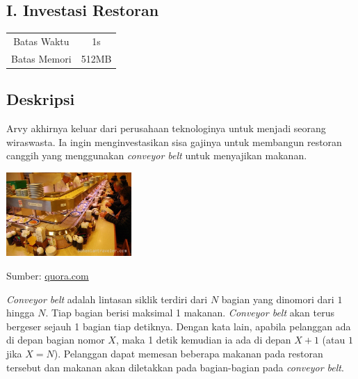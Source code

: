 \documentclass{article}
\begin{document}
\begin{center}
    \section*{I. Investasi Restoran}

    \begin{tabular}{ | c c | }
        \hline
        Batas Waktu  & 1s \\
        Batas Memori & 512MB \\
        \hline
    \end{tabular}
\end{center}

\subsection*{Deskripsi}

Arvy akhirnya keluar dari perusahaan teknologinya untuk menjadi seorang wiraswasta.
Ia ingin menginvestasikan sisa gajinya untuk membangun restoran canggih yang menggunakan \textit{conveyor belt} untuk menyajikan makanan.

\begin{center}
    \includegraphics[width=180px]{conveyor-belt}

    \footnotesize Sumber: \href{https://www.quora.com/How-much-food-should-I-take-at-a-conveyor-belt-sushi-restaurant-I-am-an-exchange-student-in-Japan-and-my-host-family-is-taking-me-to-a-restaurant-where-you-take-all-you-can-eat-How-much-should-I-take-The-family-seems-fairly-well-off}{quora.com}
\end{center}

\textit{Conveyor belt} adalah lintasan siklik terdiri dari $N$ bagian yang dinomori dari $1$ hingga $N$.
Tiap bagian berisi maksimal 1 makanan.
\textit{Conveyor belt} akan terus bergeser sejauh 1 bagian tiap detiknya.
Dengan kata lain, apabila pelanggan ada di depan bagian nomor $X$, maka 1 detik kemudian ia ada di depan $X + 1$ (atau $1$ jika $X = N$).
Pelanggan dapat memesan beberapa makanan pada restoran tersebut dan makanan akan diletakkan pada bagian-bagian pada \textit{conveyor belt}.
\end{document}
